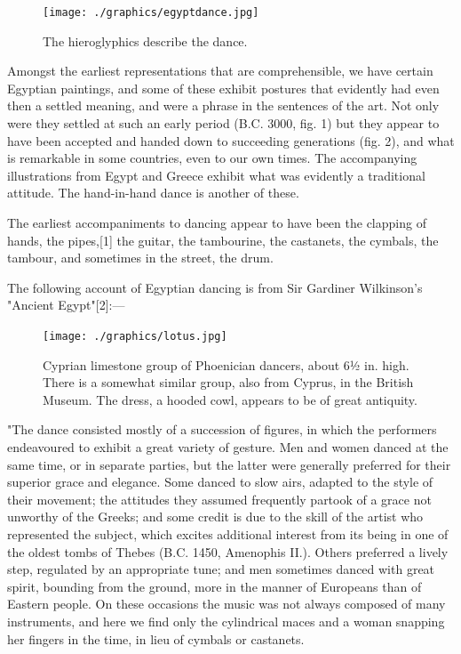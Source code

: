\begin{figure}
\centering\small
\texttt{[image: ./graphics/egyptdance.jpg]}  
\caption{\small The hieroglyphics describe the dance.}
\end{figure}
Amongst the earliest representations that are comprehensible, we have certain Egyptian paintings, and some of these exhibit postures that evidently had even then a settled meaning, and were a phrase in the sentences of the art. Not only were they settled at such an early period (B.C. 3000, fig. 1) but they appear to have been accepted and handed down to succeeding generations (fig. 2), and what is remarkable in some countries, even to our own times. The accompanying illustrations from Egypt and Greece exhibit what was evidently a traditional attitude. The hand-in-hand dance is another of these.

The earliest accompaniments to dancing appear to have been the clapping of hands, the pipes,[1] the guitar, the tambourine, the castanets, the cymbals, the tambour, and sometimes in the street, the drum.

The following account of Egyptian dancing is from Sir Gardiner Wilkinson's "Ancient Egypt"[2]:—
\begin{figure}
   \texttt{[image: ./graphics/lotus.jpg]} 
   \caption{\small Cyprian limestone group of Phoenician dancers, about 6½ in. high. There is a somewhat similar group, also from Cyprus, in the British Museum. The dress, a hooded cowl, appears to be of great antiquity.}
\end{figure}
"The dance consisted mostly of a succession of figures, in which the performers endeavoured to exhibit a great variety of gesture. Men and women danced at the same time, or in separate parties, but the latter were generally preferred for their superior grace and elegance. Some danced to slow airs, adapted to the style of their movement; the attitudes they assumed frequently partook of a grace not unworthy of the Greeks; and some credit is due to the skill of the artist who represented the subject, which excites additional interest from its being in one of the oldest tombs of Thebes (B.C. 1450, Amenophis II.). Others preferred a lively step, regulated by an appropriate tune; and men sometimes danced with great spirit, bounding from the ground, more in the manner of Europeans than of Eastern people. On these occasions the music was not always composed of many instruments, and here we find only the cylindrical maces and a woman snapping her fingers in the time, in lieu of cymbals or castanets.


